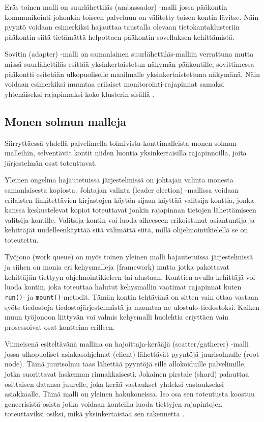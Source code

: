\documentclass[finnish,gradu]{tktltiki3}
\begin{document}
    Eräs toinen malli on suurlähettiläs (ambassador) -malli jossa pääkontin kommunikointi johonkin toiseen palveluun on välitetty toisen kontin lävitse. Näin pyyntö voidaan esimerkiksi hajauttaa taustalla olevaan tietokantaklusteriin pääkontin siitä tietämättä helpottaen pääkontin sovelluksen kehittämistä.
    
    Sovitin (adapter) -malli on samanlainen suurlähettiläs-malliin verrattuna mutta missä suurlähettiläs esittää yksinkertaistetun näkymän pääkontille, sovittimessa pääkontti esitetään ulkopuoliselle maailmalle yksinkertaistettuna näkymänä. Näin voidaan esimerkiksi muuntaa erilaiset monitorointi-rajapinnat samaksi yhtenäiseksi rajapinnaksi koko klusterin sisällä \cite{container-design-patterns}.
    
    \subsection{Monen solmun malleja}
    
    Siirryttäessä yhdellä palvelimella toimivista konttimalleista monen solmun malleihin, selventävät kontit niiden luontia yksinkertaisilla rajapinnoilla, joita järjestelmän osat toteuttavat.
    
    Yleinen ongelma hajautetuissa järjestelmissä on johtajan valinta monesta samanlaisesta kopiosta. Johtajan valinta (leader election) -mallissa voidaan erilaisten linkitettävien kirjastojen käytön sijaan käyttää valitsija-konttia, jonka kanssa keskustelevat kopiot toteuttavat jonkin rajapinnan tietojen lähettämiseen valitsija-kontille. Valitsija-kontin voi luoda aiheeseen erikoistunut asiantuntija ja kehittäjät uudelleenkäyttää sitä välimättä siitä, millä ohjelmointikielellä se on toteutettu.
    
    Työjono (work queue) on myös toinen yleinen malli hajautetuissa järjestelmissä ja siihen on monia eri kehysmalleja (framework) mutta jotka pakottavat kehittäjän tiettyyn ohjelmointikieleen tai alustaan. Konttien avulla kehittäjä voi luoda kontin, joka toteuttaa halutut kehysmallin vaatimat rajapinnat kuten \texttt{run()}- ja \texttt{mount()}-metodit. Tämän kontin tehtävänä on sitten vain ottaa vastaan syöte-tiedostoja tiedostojärjestelmästä ja muuntaa ne ulostulo-tiedostoksi. Kaiken muun työjonoon liittyvän voi valmis kehysmalli huolehtia eriyttäen vain prosessoivat osat kontteina erilleen.
    
    Viimeisenä esiteltävänä mallina on hajoittaja-kerääjä (scatter/gatherer) -malli jossa ulkopuoliset asiakasohjelmat (client) lähettävät pyyntöjä juurisolmulle (root node). Tämä juurisolmu taas lähettää pyyntöjä sille allokoiduille palvelimille, jotka suorittavat laskennan rinnakkaisesti. Jokainen pirstale (shard) palauttaa osittaisen datansa juurelle, joka kerää vastaukset yhdeksi vastaukseksi asiakkaalle. Tämä malli on yleinen hakukoneissa. Iso osa sen toteutusta koostuu geneerisistä osista jotka voidaan konteilla luoda tiettyjen rajapintojen toteuttaviksi osiksi, mikä yksinkertaistaa sen rakennetta \cite{container-design-patterns}.
    
\end{document}
